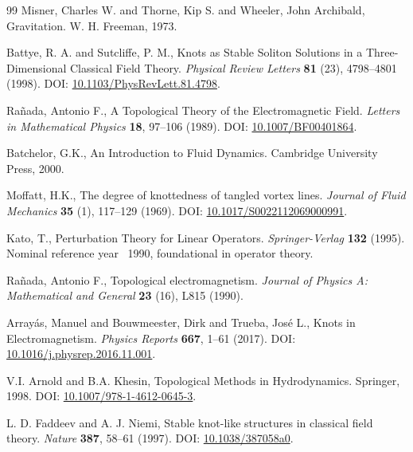 \documentclass[preprint]{revtex4-2}
\begin{document}
\begin{thebibliography}{99}
Misner, Charles W. and Thorne, Kip S. and Wheeler, John Archibald,
\newblock Gravitation.
\newblock W. H. Freeman, 1973.


Battye, R. A. and Sutcliffe, P. M.,
\newblock Knots as Stable Soliton Solutions in a Three-Dimensional Classical Field Theory.
\textit{Physical Review Letters} \textbf{81} (23), 4798--4801 (1998).
\newblock DOI: \href{https://doi.org/10.1103/PhysRevLett.81.4798}{10.1103/PhysRevLett.81.4798}.


Ra\~nada, Antonio F.,
\newblock A Topological Theory of the Electromagnetic Field.
\textit{Letters in Mathematical Physics} \textbf{18}, 97--106 (1989).
\newblock DOI: \href{https://doi.org/10.1007/BF00401864}{10.1007/BF00401864}.


Batchelor, G.K.,
\newblock An Introduction to Fluid Dynamics.
\newblock Cambridge University Press, 2000.


Moffatt, H.K.,
\newblock The degree of knottedness of tangled vortex lines.
\textit{Journal of Fluid Mechanics} \textbf{35} (1), 117--129 (1969).
\newblock DOI: \href{https://doi.org/10.1017/S0022112069000991}{10.1017/S0022112069000991}.


Kato, T.,
\newblock Perturbation Theory for Linear Operators.
\textit{Springer-Verlag} \textbf{132} (1995).
\newblock Nominal reference year ~1990, foundational in operator theory.


Rañada, Antonio F.,
\newblock Topological electromagnetism.
\textit{Journal of Physics A: Mathematical and General} \textbf{23} (16), L815 (1990).


Array\'as, Manuel and Bouwmeester, Dirk and Trueba, Jos\'e L.,
\newblock Knots in Electromagnetism.
\textit{Physics Reports} \textbf{667}, 1--61 (2017).
\newblock DOI: \href{https://doi.org/10.1016/j.physrep.2016.11.001}{10.1016/j.physrep.2016.11.001}.


V.I. Arnold and B.A. Khesin,
\newblock Topological Methods in Hydrodynamics.
\newblock Springer, 1998.
\newblock DOI: \href{https://doi.org/10.1007/978-1-4612-0645-3}{10.1007/978-1-4612-0645-3}.


L. D. Faddeev and A. J. Niemi,
\newblock Stable knot-like structures in classical field theory.
\textit{Nature} \textbf{387}, 58--61 (1997).
\newblock DOI: \href{https://doi.org/10.1038/387058a0}{10.1038/387058a0}.



\end{thebibliography}
\end{document}
